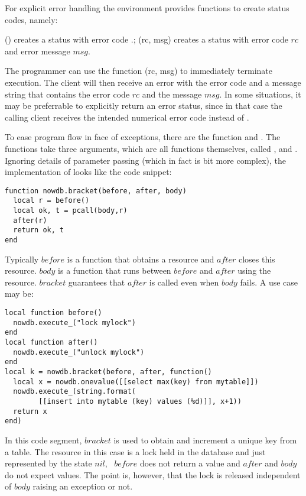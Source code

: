 For explicit error handling
the environment provides functions to
create status codes, namely:

() creates a status with error code
.;
(rc, msg) creates a status with error code $rc$ and
error message $msg$.

The programmer can use the function
(rc, msg) to immediately terminate
execution. The client will then receive an error
with the error code  and a message string
that contains the error code $rc$ and the message $msg$.
In some situations, it may be preferrable
to explicitly return an error status, since in that case
the calling client receives the intended numerical
error code instead of .

To ease program flow in face of exceptions,
there are the function  and
.
The functions take three arguments,
which are all functions themselves, called
,  and .
Ignoring details of parameter passing
(which in fact is bit more complex),
the implementation of  looks
like the code snippet:

\begin{lua}
\begin{lstlisting}
function nowdb.bracket(before, after, body)
  local r = before()
  local ok, t = pcall(body,r)
  after(r)
  return ok, t
end
\end{lstlisting}
\end{lua}

Typically $before$ is a function that obtains a resource
and $after$ closes this resource. $body$ is a function
that runs between $before$ and $after$ using the resource.
$bracket$ guarantees that $after$ is called
even when $body$ fails. A use case may be:

\begin{lua}
\begin{lstlisting}
local function before() 
  nowdb.execute_("lock mylock")
end
local function after()
  nowdb.execute_("unlock mylock")
end
local k = nowdb.bracket(before, after, function()
  local x = nowdb.onevalue([[select max(key) from mytable]])
  nowdb.execute_(string.format(
        [[insert into mytable (key) values (%d)]], x+1))
  return x
end)
\end{lstlisting}
\end{lua}

In this code segment, $bracket$ is used to obtain
and increment a unique key from a table.
The resource in this case is a lock held in the database and
just represented by the state $nil$, \ie\
$before$ does not return a value and $after$ and $body$
do not expect values. The point is, however,
that the lock is released independent of $body$
raising an exception or not.

